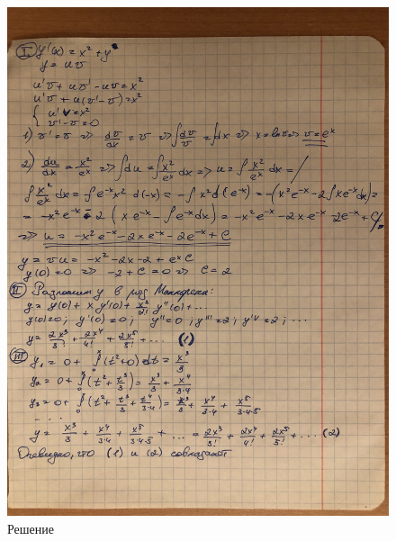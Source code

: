 \documentclass[12pt]{report}
\begin{document}
\begin{figure}[h!p]
	\centering
	\includegraphics[scale=0.13]{solve.jpg}
	\caption{Решение}
	\label{comp}
\end{figure}
\end{document}
